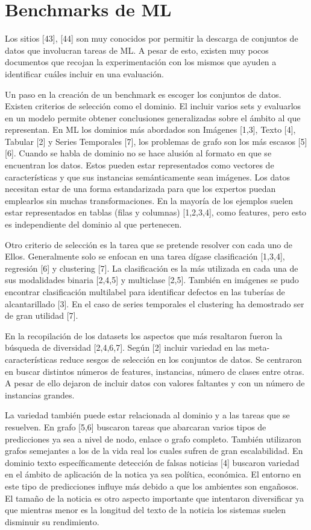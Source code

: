 \section{Benchmarks de ML}\label{section:bench_ML}

Los sitios [43], [44] son muy conocidos por permitir la descarga de conjuntos de datos que involucran tareas de ML. A pesar de esto, existen muy pocos documentos que 
recojan la experimentación con los mismos que ayuden a identificar cuáles incluir en una evaluación.

Un paso en la creación de un benchmark es escoger los conjuntos de datos. Existen criterios de selección como el dominio. El incluir varios sets y evaluarlos en un 
modelo permite obtener conclusiones generalizadas sobre el ámbito al que representan.  En ML los dominios más abordados son Imágenes [1,3], Texto [4], Tabular [2] y 
Series Temporales [7], los problemas de grafo son los más escasos [5][6]. Cuando se habla de dominio no se hace alusión al formato en que se encuentran los datos. Estos 
pueden estar representados como vectores de características y que sus instancias semánticamente sean imágenes. Los datos necesitan estar de una forma estandarizada para 
que los expertos puedan emplearlos sin muchas transformaciones. En la mayoría de los ejemplos suelen estar representados en tablas (filas y columnas) [1,2,3,4], como 
features, pero esto es independiente del dominio al que pertenecen.

Otro criterio de selección es la tarea que se pretende resolver con cada uno de Ellos. Generalmente solo se enfocan en una tarea dígase clasificación [1,3,4], regresión [6] y 
clustering [7]. La clasificación es la más utilizada en cada una de sus modalidades binaria [2,4,5] y multiclase [2,5]. También en imágenes se pudo encontrar 
clasificación multilabel para identificar defectos en las tuberías de alcantarillado [3]. En el caso de series temporales el clustering ha demostrado ser de gran 
utilidad [7].

En la recopilación de los datasets los aspectos que más resaltaron fueron la búsqueda de diversidad [2,4,6,7]. Según [2] incluir variedad en las meta-características 
reduce sesgos de selección en los conjuntos de datos. Se centraron en buscar distintos números de features, instancias, número de clases entre otras. A pesar de ello 
dejaron de incluir datos con valores faltantes y con un número de instancias grandes.

La variedad también puede estar relacionada al dominio y a las tareas que se resuelven. En grafo [5,6] buscaron tareas que abarcaran varios tipos de predicciones ya 
sea a nivel de nodo, enlace o grafo completo. También utilizaron grafos semejantes a los de la vida real los cuales sufren de gran escalabilidad. En dominio texto específicamente 
detección de falsas noticias [4] buscaron variedad en el ámbito de aplicación de la notica ya sea política, económica. El entorno en este tipo de predicciones influye 
más debido a que los ambientes son engañosos. El tamaño de la noticia es otro aspecto importante que intentaron diversificar ya que mientras menor es la longitud del 
texto de la noticia los sistemas suelen disminuir su rendimiento.

